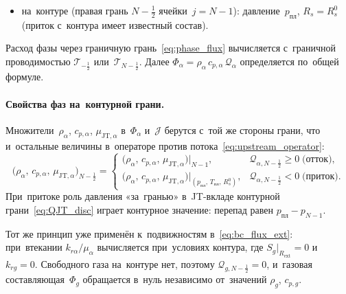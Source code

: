 \documentclass[12pt,a4paper]{article}
\newcommand{\half}{\tfrac{1}{2}}
\newcommand{\rw}{r_w}
\newcommand{\Rext}{R_{\mathrm{ext}}}
\newcommand{\ppl}{p_{\text{пл}}}
\newcommand{\pwf}{p_{\mathrm{wf}}}
\newcommand{\Tpl}{T_{\text{пл}}}
\begin{document}
\begin{itemize}[nosep]
    Перепад $p_0 - \pwf$ можно было~бы добавить в~уравнение
    ячейки~0 без двойного учёта: JT-вклады ячеек покрыли~бы весь
    перепад от~$\pwf$ до~$\ppl$, и~в~стационаре
    однофазного течения $T_0$ совпала~бы с~$T(\rw)$. В~двухфазной
    зоне погрешности первого порядка это не~снимает: на~той~же
    полуячейке идёт разгазирование, которого~\eqref{eq:mdot_disc}
    у~забоя не~содержит, а~погрешность~$T_0$ определяется схемой
    в~целом, а~не~одной этой полуячейкой. При~скин-факторе $s > 0$ перепад
    $p_0 - \pwf$ включает перепад на~скин-зоне; дросселирование
    и~разгазирование на~нём в~температуру не~входят ни~при каком~$N$;
  \item на~контуре (правая грань $N-\half$ ячейки~$j = N{-}1$):
    давление~$\ppl$,
    $R_s = R_s^0$
    (приток с~контура имеет известный состав).
\end{itemize}
Расход фазы через граничную грань~\eqref{eq:phase_flux}
вычисляется с~граничной проводимостью $\mathcal{T}_{-\half}$
или~$\mathcal{T}_{N-\half}$. Далее
$\Phi_{\alpha} = \rho_\alpha\,c_{p,\alpha}\,\mathcal{Q}_\alpha$
определяется по~общей формуле.

\paragraph{Свойства фаз на~контурной грани.}
Множители~$\rho_\alpha$, $c_{p,\alpha}$, $\mu_{\mathrm{JT},\alpha}$
в~$\Phi_\alpha$ и~$\mathcal{J}$ берутся с~той же стороны грани,
что и~остальные величины в~операторе против
потока~\eqref{eq:upstream_operator}:
\begin{equation}\label{eq:bc_props_ext}
  \boxed{
  \bigl(\rho_\alpha,\,c_{p,\alpha},\,\mu_{\mathrm{JT},\alpha}
  \bigr)_{N-\half}
  =
  \begin{cases}
    \bigl(\rho_\alpha,\,c_{p,\alpha},\,\mu_{\mathrm{JT},\alpha}
    \bigr)\big|_{N-1},
      & \mathcal{Q}_{\alpha,N-\half} \geqslant 0
        \;\text{(отток)},\\[6pt]
    \bigl(\rho_\alpha,\,c_{p,\alpha},\,\mu_{\mathrm{JT},\alpha}
    \bigr)\big|_{(\ppl,\,\Tpl,\,R_s^0)},
      & \mathcal{Q}_{\alpha,N-\half} < 0
        \;\text{(приток)}.
  \end{cases}}
\end{equation}
При~притоке роль давления «за~гранью» в~JT-вкладе
контурной грани~\eqref{eq:QJT_disc} играет контурное значение:
перепад равен $\ppl - p_{N-1}$.

Тот же принцип уже применён к~подвижностям
в~\eqref{eq:bc_flux_ext}: при~втекании $k_{r\alpha}/\mu_\alpha$
вычисляется при~условиях контура, где $S_g\big|_{\Rext} = 0$
и~$k_{rg} = 0$. Свободного газа на~контуре нет, поэтому
$\mathcal{Q}_{g,N-\half} = 0$, и~газовая составляющая~$\Phi_g$
обращается в~нуль независимо от~значений $\rho_g$, $c_{p,g}$.
\end{document}
